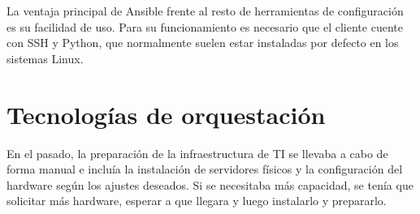 	La ventaja principal de Ansible frente al resto de herramientas de configuración es su facilidad de uso. Para su funcionamiento es necesario que el cliente cuente con SSH y Python, que normalmente suelen estar instaladas por defecto en los sistemas Linux. 
        
% 	
% 	
%
%
%
\clearpage

\section{Tecnologías de orquestación} \label{sec:orq}
	En el pasado, la preparación de la infraestructura de TI se llevaba a cabo de forma manual e incluía la instalación de servidores físicos y la configuración del hardware según los ajustes deseados. Si se necesitaba más capacidad, se tenía que solicitar más hardware, esperar a que llegara y luego instalarlo y prepararlo.~\cite{orq1} 

